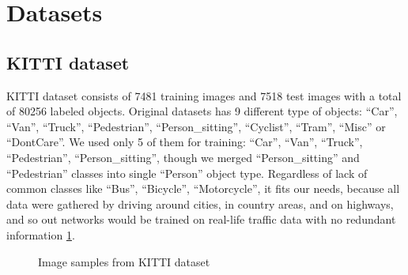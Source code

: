 \documentclass[twoside]{ctuthesis}
\theoremstyle{plain}
\theoremstyle{definition}
\theoremstyle{note}
\begin{document}
\section{Datasets}
\subsection{KITTI dataset}
KITTI dataset consists of 7481 training images and 7518 test images with a total of 80256 labeled objects. Original datasets has 9 different type of objects: ``Car'', ``Van'', ``Truck'', ``Pedestrian'', ``Person\_sitting'', ``Cyclist'', ``Tram'', ``Misc'' or ``DontCare''. We used only 5 of them for training: ``Car'', ``Van'', ``Truck'', ``Pedestrian'', ``Person\_sitting'', though we merged ``Person\_sitting'' and ``Pedestrian'' classes into single ``Person'' object type. Regardless   of lack of common classes like ``Bus'', ``Bicycle'', ``Motorcycle'', it fits our needs, because all data were gathered by driving around cities, in country areas, and on highways, and so out networks would be trained on real-life traffic data with no redundant information \ref{fig:kitti-examples}.       
\begin{figure}[hbt]
        \centering
        
        \hfill
                \caption{Image samples from KITTI dataset}
                \label{fig:kitti-examples}
\end{figure}
\end{document}
